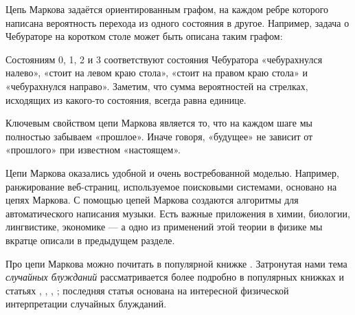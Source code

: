 \documentclass{article}
\begin{document}
Цепь Маркова задаётся ориентированным графом, 
на каждом ребре которого написана вероятность перехода из одного состояния в другое.
Например, задача о Чебураторе на коротком столе может быть описана таким графом:
\begin{center}
\end{center}
Состояниям 0, 1, 2 и 3 соответствуют состояния Чебуратора «чебурахнулся налево», «стоит на левом краю стола», «стоит на правом краю стола» и «чебурахнулся направо».
Заметим, что сумма вероятностей на стрелках, исходящих из какого-то состояния, всегда равна единице.

Ключевым свойством цепи Маркова является то, что на каждом шаге
мы полностью забываем «прошлое».
Иначе говоря, «будущее» не зависит от «прошлого» при известном «настоящем».

Цепи Маркова оказались удобной и очень востребованной моделью.
Например, ранжирование веб-страниц, используемое поисковыми системами, основано на цепях Маркова.
С помощью цепей Маркова создаются алгоритмы для автоматического написания музыки.
Есть важные приложения в химии, биологии, лингвистике, экономике --- а одно из применений этой теории в физике мы вкратце описали в предыдущем разделе.

Про цепи Маркова можно почитать в популярной книжке \cite{dynkin-uspenskij}.
Затронутая нами тема \emph{случайных блужданий} рассматривается более подробно в популярных книжках и статьях 
\cite{KZhP}, 
\cite{mosteller}, 
\cite{sobolev}, 
\cite{SKU}; 
последняя статья основана на интересной физической интерпретации случайных блужданий.
\end{document}
